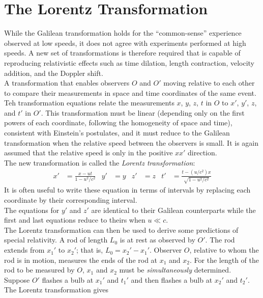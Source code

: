 \documentclass{subfiles}
\begin{document}
	\section{The Lorentz Transformation}
		While the Galilean transformation holds for the \enquote{common-sense} experience observed at low speeds, it does not agree with experiments performed at high speeds. A new set of transformations is therefore required that is capable of reproducing relativistic effects such as time dilation, length contraction, velocity addition, and the Doppler shift. \\
		A transformation that enables observers \(O\) and \(O'\) moving relative to each other to compare their measurements in space and time coordinates of the same event. Teh transformation equations relate the measurements \(x\), \(y\), \(z\), \(t\) in \(O\) to \(x'\), \(y'\), \(z\), and \(t'\) in \(O'\). This transformation must be linear (depending only on the first powers of each coordinate, following the homogeneity of space and time), consistent with Einstein's postulates, and it must reduce to the Galilean transformation when the relative speed between the observers is small. It is again assumed that the relative speed is only in the positive \(xx'\) direction. \\
		The new transformation is called the \textit{Lorentz transformation}:
		\begin{align*}
			x' &= \frac{x - ut}{1 - u^2/c^2} &
				y' &= y &
				z' &= z &
				t' &= \frac{t - (u/c^2)x}{\sqrt{1 - u^2/c^2}}
					\tag{Lorentz transformation}
		\end{align*}
		It is often useful to write these equation in terms of intervals by replacing each coordinate by their corresponding interval. \\
		The equations for \(y'\) and \(z'\) are identical to their Galilean counterparts while the first and last equations reduce to theirs when \(u \ll c\). \\
		The Lorentz transformation can then be used to derive some predictions of special relativity.
			A rod of length \(L_0\) is at rest as observed by \(O'\). The rod extends from \(x_1'\) to \(x_2'\); that is, \(L_0 = x_2' - x_1'\). Observer \(O\), relative to whom the rod is in motion, measures the ends of the rod at \(x_1\) and \(x_2\). For the length of the rod to be measured by \(O\), \(x_1\) and \(x_2\) must be \textit{simultaneously} determined. \\
			Suppose \(O'\) flashes a bulb at \(x_1'\) and \(t_1'\) and then flashes a bulb at \(x_2'\) and \(t_2'\). The Lorentz transformation gives
\end{document}
